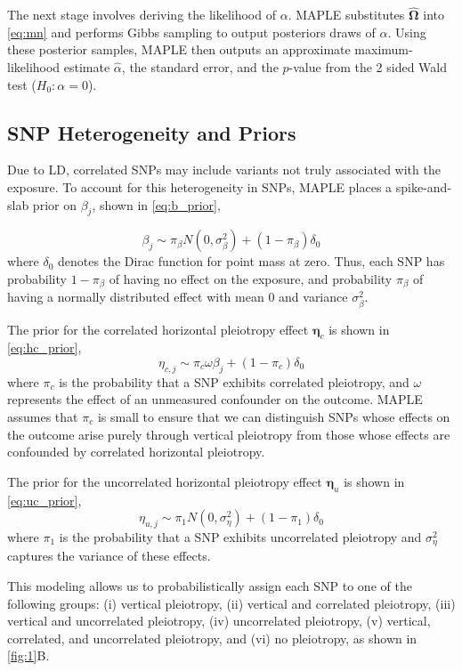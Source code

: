 \documentclass[12pt]{article}
\begin{document}
The next stage involves deriving the likelihood of $\alpha$. MAPLE substitutes $\boldsymbol{\hat\Omega}$ into \cref{eq:mn} and performs Gibbs sampling to output posteriors draws of $\alpha$. Using these posterior samples, MAPLE then outputs an approximate maximum-likelihood estimate $\hat \alpha$, the standard error, and the $p$-value from the 2 sided Wald test ($H_0: \alpha=0$).

\subsection{SNP Heterogeneity and Priors}\label{sec:priors}

Due to LD, correlated SNPs may include variants not truly associated with the exposure. To account for this heterogeneity in SNPs, MAPLE places a spike-and-slab prior on $\beta_j$, shown in \cref{eq:b_prior},

\[\label{eq:b_prior}
\beta_j \sim \pi_\beta N(0, \sigma^2_\beta) + (1-\pi_\beta)\delta_0\]
where $\delta_0$ denotes the Dirac function for point mass at zero. Thus, each SNP has probability $1 - \pi_\beta$ of having no effect on the exposure, and probability $\pi_\beta$ of having a normally distributed effect with mean 0 and variance $\sigma_\beta^2$.

The prior for the correlated horizontal pleiotropy effect $\boldsymbol \eta_c$ is shown in \cref{eq:hc_prior},
\[ \label{eq:hc_prior}
\eta_{c,j} \sim \pi_c \omega \beta_j + (1-\pi_c)\delta_0\] where $\pi_c$ is the probability that a SNP exhibits correlated pleiotropy, and $\omega$ represents the effect of an unmeasured confounder on the outcome. MAPLE assumes that $\pi_c$ is small to ensure that we can distinguish SNPs whose effects on the outcome arise purely through vertical pleiotropy from those whose effects are confounded by correlated horizontal pleiotropy.

The prior for the uncorrelated horizontal pleiotropy effect $\boldsymbol \eta_u$ is shown in \cref{eq:uc_prior},
\[ \label{eq:uc_prior}
\eta_{u,j} \sim \pi_1 N(0,\sigma_\eta^2) + (1-\pi_1)\delta_0\]
where $\pi_1$ is the probability that a SNP exhibits uncorrelated pleiotropy and $\sigma_\eta^2$ captures the variance of these effects.

This modeling allows us to probabilistically assign each SNP to one of the following groups: (i) vertical pleiotropy, (ii) vertical and correlated pleiotropy, (iii) vertical and uncorrelated pleiotropy, (iv) uncorrelated pleiotropy, (v) vertical, correlated, and uncorrelated pleiotropy, and (vi) no pleiotropy, as shown in \cref{fig:1}B. 
\end{document}
